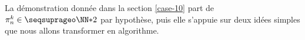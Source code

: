 \leavevmode
\smallskip

La démonstration donnée dans la section \ref{case-10} part de $\consprod \in \NNssquare$ par hypothèse, puis elle s'appuie sur deux idées simples que nous allons transformer en algorithme.

